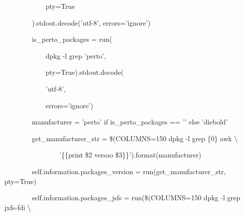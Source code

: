            {\ttfamily\color[rgb]{0.10980392,0.10980392,0.10980392}
            \ \ \ \ \ \ \ \ \ \ \ \ pty=True}

            {\ttfamily\color[rgb]{0.10980392,0.10980392,0.10980392}
            \ \ \ \ \ \ \ \ ).stdout.decode('utf-8', errors='ignore')}


    \bigskip

{\ttfamily\color[rgb]{0.10980392,0.10980392,0.10980392}
    \ \ \ \ \ \ \ \ is\_perto\_packages = run(}

            {\ttfamily\color[rgb]{0.10980392,0.10980392,0.10980392}
            \ \ \ \ \ \ \ \ \ \ \ \ {\textquotedbl}dpkg -l {\textbar}grep 'perto'{\textquotedbl},}

            {\ttfamily\color[rgb]{0.10980392,0.10980392,0.10980392}
            \ \ \ \ \ \ \ \ \ \ \ \ pty=True).stdout.decode(}

                {\ttfamily\color[rgb]{0.10980392,0.10980392,0.10980392}
                \ \ \ \ \ \ \ \ \ \ \ \ {}'utf-8',}

                {\ttfamily\color[rgb]{0.10980392,0.10980392,0.10980392}
                \ \ \ \ \ \ \ \ \ \ \ \ errors='ignore')}


            \bigskip

{\ttfamily\color[rgb]{0.10980392,0.10980392,0.10980392}
    \ \ \ \ \ \ \ \ manufacturer = 'perto' if is\_perto\_packages == '{}' else 'diebold'}

{\ttfamily\color[rgb]{0.10980392,0.10980392,0.10980392}
    \ \ \ \ \ \ \ \ get\_manufacturer\_str = {\textquotedbl}{\textquotedbl}{\textquotedbl}\$(COLUMNS=150 dpkg -l
            {\textbar}grep {\textquotedbl}\{0\}{\textquotedbl} {\textbar} awk {\textbackslash}}

            {\ttfamily\color[rgb]{0.10980392,0.10980392,0.10980392}
            \ \ \ \ \ \ \ \ \ \ \ \ \ \ \ \ {}'\{\{print \$2 {\textquotedbl} {\textquotedbl} {\textquotedbl}versao{\textquotedbl}
            {\textquotedbl} {\textquotedbl} \$3\}\}'){\textquotedbl}{\textquotedbl}{\textquotedbl}.format(manufacturer)}


    \bigskip

{\ttfamily\color[rgb]{0.10980392,0.10980392,0.10980392}
    \ \ \ \ \ \ \ \ self.information.packages\_version = run(get\_manufacturer\_str, pty=True)}

{\ttfamily\color[rgb]{0.10980392,0.10980392,0.10980392}
    \ \ \ \ \ \ \ \ self.information.packages\_jsfs = run({\textquotedbl}{\textquotedbl}{\textquotedbl}\$(COLUMNS=150 dpkg
                -l {\textbar}grep {\textquotedbl}jxfs-fdi{\textquotedbl} {\textbar} {\textbackslash}}

